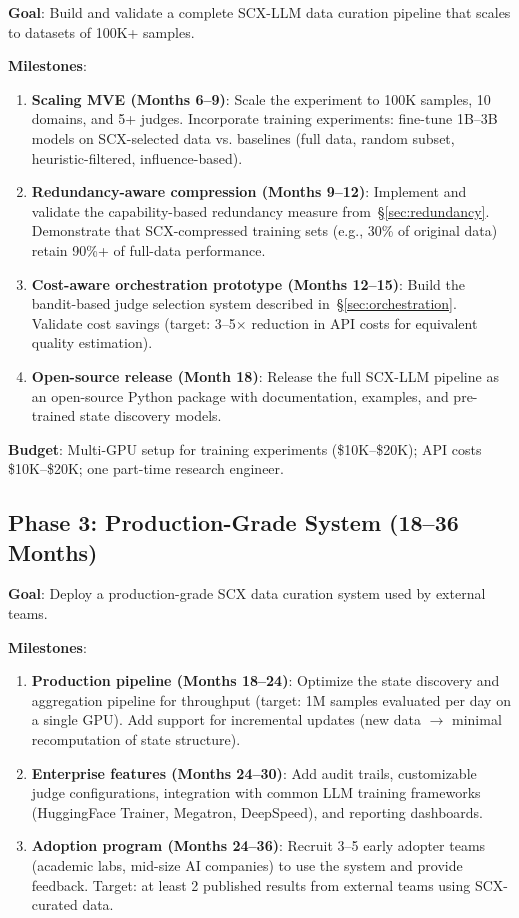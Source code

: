 \documentclass[11pt,twocolumn]{article}
\begin{document}
\textbf{Goal}: Build and validate a complete SCX-LLM data curation pipeline that scales to datasets of 100K+ samples.

\textbf{Milestones}:
\begin{enumerate}
    \item \textbf{Scaling MVE (Months 6--9)}: Scale the experiment to 100K samples, 10 domains, and 5+ judges. Incorporate training experiments: fine-tune 1B--3B models on SCX-selected data vs. baselines (full data, random subset, heuristic-filtered, influence-based).
    \item \textbf{Redundancy-aware compression (Months 9--12)}: Implement and validate the capability-based redundancy measure from~\S\ref{sec:redundancy}. Demonstrate that SCX-compressed training sets (e.g., 30\% of original data) retain 90\%+ of full-data performance.
    \item \textbf{Cost-aware orchestration prototype (Months 12--15)}: Build the bandit-based judge selection system described in~\S\ref{sec:orchestration}. Validate cost savings (target: 3--5$\times$ reduction in API costs for equivalent quality estimation).
    \item \textbf{Open-source release (Month 18)}: Release the full SCX-LLM pipeline as an open-source Python package with documentation, examples, and pre-trained state discovery models.
\end{enumerate}

\textbf{Budget}: Multi-GPU setup for training experiments (\$10K--\$20K); API costs \$10K--\$20K; one part-time research engineer.

\subsection{Phase 3: Production-Grade System (18--36 Months)}

\textbf{Goal}: Deploy a production-grade SCX data curation system used by external teams.

\textbf{Milestones}:
\begin{enumerate}
    \item \textbf{Production pipeline (Months 18--24)}: Optimize the state discovery and aggregation pipeline for throughput (target: 1M samples evaluated per day on a single GPU). Add support for incremental updates (new data $\rightarrow$ minimal recomputation of state structure).
    \item \textbf{Enterprise features (Months 24--30)}: Add audit trails, customizable judge configurations, integration with common LLM training frameworks (HuggingFace Trainer, Megatron, DeepSpeed), and reporting dashboards.
    \item \textbf{Adoption program (Months 24--36)}: Recruit 3--5 early adopter teams (academic labs, mid-size AI companies) to use the system and provide feedback. Target: at least 2 published results from external teams using SCX-curated data.
\end{enumerate}
\end{document}
